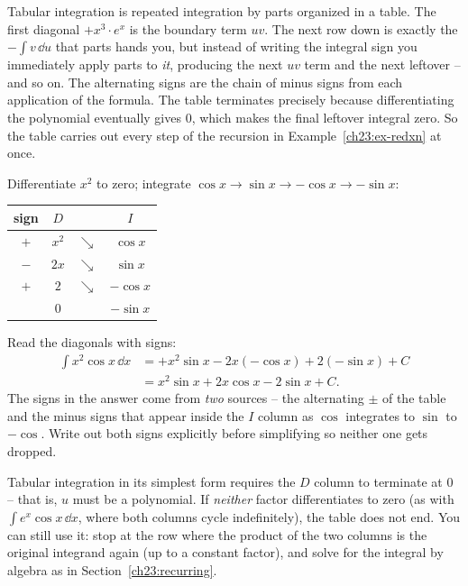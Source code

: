 \begin{whybox}
Tabular integration is repeated integration by parts organized in a table. The first
diagonal $+x^3\cdot e^x$ is the boundary term $uv$. The next row down is exactly
the $-\int v\,\dd u$ that parts hands you, but instead of writing the integral
sign you immediately apply parts to \emph{it}, producing the next $uv$ term and
the next leftover -- and so on. The alternating signs are the chain of minus signs
from each application of the formula. The table terminates precisely because
differentiating the polynomial eventually gives $0$, which makes the final leftover
integral zero. So the table carries out every step of the recursion in
Example~\ref{ch23:ex-redxn} at once.
\end{whybox}

\begin{example}
\label{ch23:ex-tabx2cos}
Differentiate $x^2$ to zero; integrate $\cos x \to \sin x \to -\cos x \to
-\sin x$:
\begin{center}
\begin{tabular}{c c c c}
\toprule
sign & $D$ & & $I$ \\
\midrule
$+$ & $x^2$ & $\searrow$ & $\cos x$ \\
$-$ & $2x$ & $\searrow$ & $\sin x$ \\
$+$ & $2$ & $\searrow$ & $-\cos x$ \\
& $0$ & & $-\sin x$ \\
\bottomrule
\end{tabular}
\end{center}
Read the diagonals with signs:
\begin{align*}
\int x^2\cos x\,\dd x
&= +x^2\sin x - 2x(-\cos x) + 2(-\sin x) + C\\
&= x^2\sin x + 2x\cos x - 2\sin x + C.
\end{align*}
The signs in the answer come from \emph{two} sources -- the alternating $\pm$ of
the table and the minus signs that appear inside the $I$ column as $\cos$
integrates to $\sin$ to $-\cos$. Write out both signs explicitly before
simplifying so neither one gets dropped.
\end{example}

\begin{trapbox}
Tabular integration in its simplest form requires the $D$ column to terminate at
$0$ -- that is, $u$ must be a polynomial. If \emph{neither} factor differentiates
to zero (as with $\int e^x\cos x\,\dd x$, where both columns cycle indefinitely), the
table does not end. You can still use it: stop at the row where the product of
the two columns is the original integrand again (up to a constant factor), and
solve for the integral by algebra as in Section~\ref{ch23:recurring}.
\end{trapbox}

